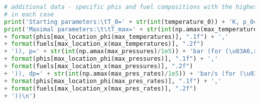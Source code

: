 \begin{lstlisting}[language=Python]
# additional data - specific phis and fuel compositions with the highest max. temp., max. pres. and max. pres. rate
# in each case
print('Starting parameters:\tT_0=' + str(int(temperature_0)) + 'K, p_0=' + str(int(pressure_0/ct.one_atm)) + 'atm')
print('Maximal parameters:\t\tT_max=' + str(int(np.amax(max_temperatures))) + 'K (for (\u03A6,x_CH4)=('
+ format(phis[max_location_phi(max_temperatures)], ".1f") + ','
+ format(fuels[max_location_x(max_temperatures)], ".2f")
+ ')), p=' + str(int(np.amax(max_pressures)/1e5)) + 'bar (for (\u03A6,x_CH4)=('
+ format(phis[max_location_phi(max_pressures)], ".1f") + ','
+ format(fuels[max_location_x(max_pressures)], ".2f")
+ ')), dp=' + str(int(np.amax(max_pres_rates)/1e5)) + 'bar/s (for (\u03A6,x_CH4)=('
+ format(phis[max_location_phi(max_pres_rates)], ".1f") + ','
+ format(fuels[max_location_x(max_pres_rates)], ".2f")
+ '))\n')

	
\end{lstlisting}



